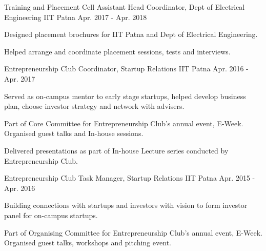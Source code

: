 
\begin{cventries}

\cventry
	{Training and Placement Cell} %
	{Assistant Head Coordinator, Dept of Electrical Engineering} %
	{IIT Patna} %
	{Apr. 2017 - Apr. 2018} %
	{\begin{cvitems} %
		\item {Designed placement brochures for IIT Patna and Dept of Electrical Engineering.}
		\item {Helped arrange and coordinate placement sessions, tests and interviews.}
	\end{cvitems}}

\cventry
	{Entrepreneurship Club} %
	{Coordinator, Startup Relations} %
	{IIT Patna} %
	{Apr. 2016 - Apr. 2017} %
	{\begin{cvitems} %
		\item {Served as on-campus mentor to early stage startups, helped develop business plan, choose investor strategy and network with advisers.}
		\item {Part of Core Committee for Entrepreneurship Club's annual event, E-Week. Organised guest talks and In-house sessions.}
		\item {Delivered presentations as part of In-house Lecture series conducted by Entrepreneurship Club.}
	\end{cvitems}}

\cventry
	{Entrepreneurship Club} %
	{Task Manager, Startup Relations} %
	{IIT Patna} %
	{Apr. 2015 - Apr. 2016} %
	{\begin{cvitems} %
		\item {Building connections with startups and investors with vision to form investor panel for on-campus startups.}
		\item {Part of Organising Committee for Entrepreneurship Club's annual event, E-Week. Organised guest talks, workshops and pitching event.}
	\end{cvitems}}

\end{cventries}
